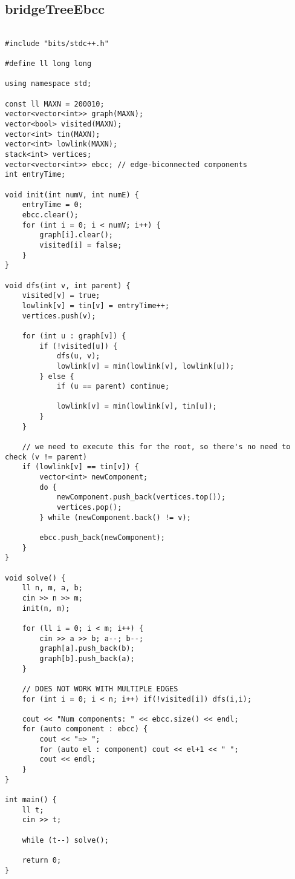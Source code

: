 \documentclass[landscape,twocolumn,10pt,a4paper]{article}
\begin{document}
\subsection{bridgeTreeEbcc}
\begin{verbatim}

#include "bits/stdc++.h"

#define ll long long

using namespace std;

const ll MAXN = 200010;
vector<vector<int>> graph(MAXN);
vector<bool> visited(MAXN);
vector<int> tin(MAXN);
vector<int> lowlink(MAXN);
stack<int> vertices;
vector<vector<int>> ebcc; // edge-biconnected components
int entryTime;

void init(int numV, int numE) {
    entryTime = 0;
    ebcc.clear();
    for (int i = 0; i < numV; i++) {
        graph[i].clear();
        visited[i] = false;
    }
}

void dfs(int v, int parent) {
    visited[v] = true;
    lowlink[v] = tin[v] = entryTime++;
    vertices.push(v); 

    for (int u : graph[v]) {
        if (!visited[u]) {
            dfs(u, v);
            lowlink[v] = min(lowlink[v], lowlink[u]);
        } else {
            if (u == parent) continue;

            lowlink[v] = min(lowlink[v], tin[u]);
        }
    }

    // we need to execute this for the root, so there's no need to check (v != parent)
    if (lowlink[v] == tin[v]) {
        vector<int> newComponent;
        do {
            newComponent.push_back(vertices.top());
            vertices.pop();
        } while (newComponent.back() != v);

        ebcc.push_back(newComponent);
    }
}

void solve() {
    ll n, m, a, b;
    cin >> n >> m;
    init(n, m);

    for (ll i = 0; i < m; i++) {
        cin >> a >> b; a--; b--;
        graph[a].push_back(b);
        graph[b].push_back(a);
    }

    // DOES NOT WORK WITH MULTIPLE EDGES
    for (int i = 0; i < n; i++) if(!visited[i]) dfs(i,i);

    cout << "Num components: " << ebcc.size() << endl; 
    for (auto component : ebcc) {
        cout << "=> ";
        for (auto el : component) cout << el+1 << " ";
        cout << endl;
    }       
}

int main() {
    ll t;
    cin >> t;

    while (t--) solve();

    return 0;
}\end{verbatim}
\end{document}
